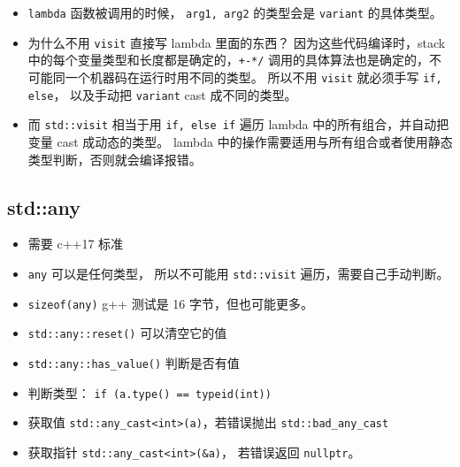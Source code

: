 \begin{itemize}
\item \verb|lambda| 函数被调用的时候， \verb|arg1, arg2| 的类型会是 \verb|variant| 的具体类型。
\item 为什么不用 \verb`visit` 直接写 lambda 里面的东西？ 因为这些代码编译时，stack 中的每个变量类型和长度都是确定的，\verb|+-*/| 调用的具体算法也是确定的，不可能同一个机器码在运行时用不同的类型。 所以不用 \verb|visit| 就必须手写 \verb|if, else|， 以及手动把 \verb|variant| cast 成不同的类型。
\item 而 \verb|std::visit| 相当于用 \verb|if, else if| 遍历 lambda 中的所有组合，并自动把变量 cast 成动态的类型。 lambda 中的操作需要适用与所有组合或者使用静态类型判断，否则就会编译报错。
\end{itemize}

\subsection{std::any}
\begin{itemize}
\item 需要 c++17 标准
\end{itemize}
\begin{itemize}
\item \verb|any| 可以是任何类型， 所以不可能用 \verb|std::visit| 遍历，需要自己手动判断。
\item \verb|sizeof(any)| g++ 测试是 16 字节，但也可能更多。
\item \verb|std::any::reset()| 可以清空它的值
\item \verb|std::any::has_value()| 判断是否有值
\item 判断类型： \verb|if (a.type() == typeid(int))|
\item 获取值 \verb|std::any_cast<int>(a)|，若错误抛出 \verb|std::bad_any_cast|
\item 获取指针 \verb|std::any_cast<int>(&a)|， 若错误返回 \verb|nullptr|。
\end{itemize}
